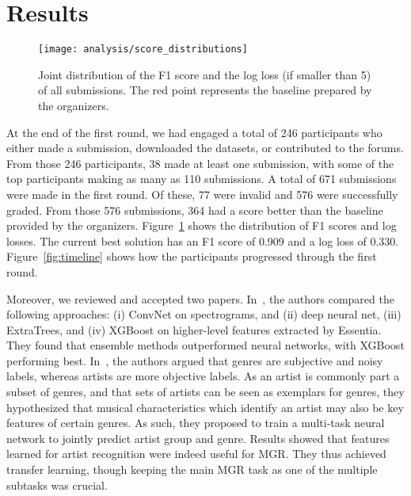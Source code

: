 \documentclass[sigconf]{acmart}
\begin{document}
\section{Results}


\begin{figure}[t]
\centering
\texttt{[image: analysis/score\_distributions]}
\caption{Joint distribution of the F1 score and the log loss (if smaller than 5) of all submissions. The red point represents the baseline prepared by the organizers.}
\label{fig:jointplot}
\end{figure}


At the end of the first round, we had engaged a total of 246 participants who either made a submission, downloaded the datasets, or contributed to the forums. From those 246 participants, 38 made at least one submission, with some of the top participants making as many as 110 submissions. %
A total of 671 submissions were made in the first round. Of these, 77 were invalid and 576 were successfully graded.
From those 576 submissions, 364 had a score better than the baseline provided by the organizers. Figure~\ref{fig:jointplot} shows the distribution of F1 scores and log losses.
The current best solution has an F1 score of 0.909 and a log loss of 0.330. %
Figure~\ref{fig:timeline} shows how the participants progressed through the first round.

Moreover, we reviewed and accepted two papers.
%
In~\cite{gradient_boosting}, the authors compared the following approaches: (i) ConvNet on spectrograms, and (ii) deep neural net, (iii) ExtraTrees, and (iv) XGBoost on higher-level features extracted by Essentia. They found that ensemble methods outperformed neural networks, with XGBoost performing best.
%
In~\cite{transfer_learning}, the authors argued that genres are subjective and noisy labels, whereas artists are more objective labels.
As an artist is commonly part a subset of genres, and that sets of artists can be seen as exemplars for genres, they hypothesized that musical characteristics which identify an artist may also be key features of certain genres.
As such, they proposed to train a multi-task neural network to jointly predict artist group and genre. Results showed that features learned for artist recognition were indeed useful for MGR.
They thus achieved transfer learning, though keeping the main MGR task as one of the multiple subtasks was crucial.
\end{document}
